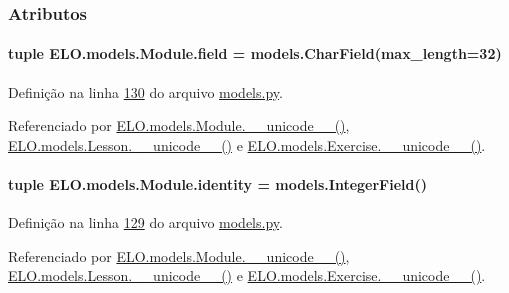 \subsubsection{Atributos}
\hypertarget{classELO_1_1models_1_1Module_ad05ba106a7012cd72877fe21e8639e2d}{
\paragraph[{field}]{\setlength{\rightskip}{0pt plus 5cm}tuple E\-L\-O.\-models.\-Module.\-field = models.\-Char\-Field(max\-\_\-length=32)\hspace{0.3cm}{\ttfamily [static]}}}\label{classELO_1_1models_1_1Module_ad05ba106a7012cd72877fe21e8639e2d}


Definição na linha \hyperlink{ELO_2models_8py_source_l00130}{130} do arquivo \hyperlink{ELO_2models_8py_source}{models.\-py}.



Referenciado por \hyperlink{classELO_1_1models_1_1Module_a1b54aa7a5e8dac090dea0926eca5550d}{E\-L\-O.\-models.\-Module.\-\_\-\-\_\-unicode\-\_\-\-\_\-()}, \hyperlink{classELO_1_1models_1_1Lesson_a3d9f0295dbe1ed5c74668d6c0876f97c}{E\-L\-O.\-models.\-Lesson.\-\_\-\-\_\-unicode\-\_\-\-\_\-()} e \hyperlink{classELO_1_1models_1_1Exercise_af3e991e5610cec815a2c3260ec6aae0b}{E\-L\-O.\-models.\-Exercise.\-\_\-\-\_\-unicode\-\_\-\-\_\-()}.

\hypertarget{classELO_1_1models_1_1Module_abbf09409159a27a42ea6cb33fcc7fde7}{
\paragraph[{identity}]{\setlength{\rightskip}{0pt plus 5cm}tuple E\-L\-O.\-models.\-Module.\-identity = models.\-Integer\-Field()\hspace{0.3cm}{\ttfamily [static]}}}\label{classELO_1_1models_1_1Module_abbf09409159a27a42ea6cb33fcc7fde7}


Definição na linha \hyperlink{ELO_2models_8py_source_l00129}{129} do arquivo \hyperlink{ELO_2models_8py_source}{models.\-py}.



Referenciado por \hyperlink{classELO_1_1models_1_1Module_a1b54aa7a5e8dac090dea0926eca5550d}{E\-L\-O.\-models.\-Module.\-\_\-\-\_\-unicode\-\_\-\-\_\-()}, \hyperlink{classELO_1_1models_1_1Lesson_a3d9f0295dbe1ed5c74668d6c0876f97c}{E\-L\-O.\-models.\-Lesson.\-\_\-\-\_\-unicode\-\_\-\-\_\-()} e \hyperlink{classELO_1_1models_1_1Exercise_af3e991e5610cec815a2c3260ec6aae0b}{E\-L\-O.\-models.\-Exercise.\-\_\-\-\_\-unicode\-\_\-\-\_\-()}.

